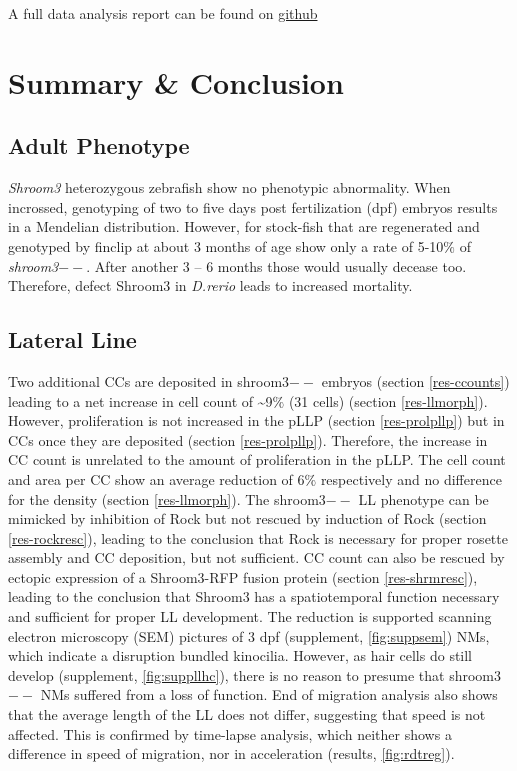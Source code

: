 \documentclass[11pt,singlespacinge,twoside]{reedthesis} %
\begin{document}
A full data analysis report can be found on \href{https://github.com/KleinhansDa/reports/blob/master/b7a875fc1ea228b9061041b7cec4bd3c52ab3ce3/clusters_ato-mo.html}{github}

\hypertarget{summary-conclusion}{%
\chapter{Summary \& Conclusion}\label{summary-conclusion}}

\hypertarget{adult-phenotype}{%
\section{Adult Phenotype}\label{adult-phenotype}}

\emph{Shroom3} heterozygous zebrafish show no phenotypic abnormality. When incrossed, genotyping of two to five days post fertilization (dpf) embryos results in a Mendelian distribution. However, for stock-fish that are regenerated and genotyped by finclip at about 3 months of age show only a rate of 5-10\(\%\) of \emph{shroom3}\(--\). After another 3 -- 6 months those would usually decease too. Therefore, defect Shroom3 in \emph{D.rerio} leads to increased mortality.

\hypertarget{lateral-line}{%
\section{Lateral Line}\label{lateral-line}}

Two additional CCs are deposited in shroom3\(--\) embryos (section \ref{res-ccounts}) leading to a net increase in cell count of \textasciitilde{}9\(\%\) (31 cells) (section \ref{res-llmorph}). However, proliferation is not increased in the pLLP (section \ref{res-prolpllp}) but in CCs once they are deposited (section \ref{res-prolpllp}). Therefore, the increase in CC count is unrelated to the amount of proliferation in the pLLP. The cell count and area per CC show an average reduction of 6\(\%\) respectively and no difference for the density (section \ref{res-llmorph}).
The shroom3\(--\) LL phenotype can be mimicked by inhibition of Rock but not rescued by induction of Rock (section \ref{res-rockresc}), leading to the conclusion that Rock is necessary for proper rosette assembly and CC deposition, but not sufficient. CC count can also be rescued by ectopic expression of a Shroom3-RFP fusion protein (section \ref{res-shrmresc}), leading to the conclusion that Shroom3 has a spatiotemporal function necessary and sufficient for proper LL development.
The reduction is supported scanning electron microscopy (SEM) pictures of 3 dpf (supplement, \ref{fig:suppsem}) NMs, which indicate a disruption bundled kinocilia. However, as hair cells do still develop (supplement, \ref{fig:suppllhc}), there is no reason to presume that shroom3\(--\) NMs suffered from a loss of function. End of migration analysis also shows that the average length of the LL does not differ, suggesting that speed is not affected. This is confirmed by time-lapse analysis, which neither shows a difference in speed of migration, nor in acceleration (results, \ref{fig:rdtreg}).
\end{document}
